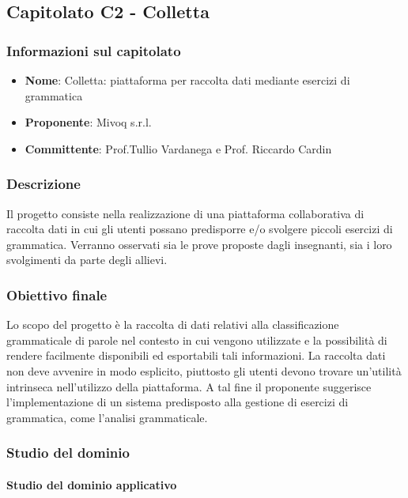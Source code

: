 \subsection{Capitolato C2 - Colletta}
\subsubsection{Informazioni sul capitolato}
\begin{itemize}
	\item \textbf{Nome}: Colletta: piattaforma per raccolta dati
	mediante esercizi di grammatica
	\item \textbf{Proponente}: Mivoq s.r.l.
	\item \textbf{Committente}: Prof.Tullio Vardanega e Prof. Riccardo Cardin
\end{itemize}
\subsubsection{Descrizione}

Il progetto consiste nella realizzazione di una piattaforma collaborativa di raccolta dati in cui gli utenti possano predisporre e/o svolgere piccoli esercizi di grammatica. Verranno osservati sia le prove proposte dagli insegnanti, sia i loro svolgimenti da parte degli allievi.
\subsubsection{Obiettivo finale}

Lo scopo del progetto è la raccolta di dati relativi alla classificazione grammaticale di parole nel contesto in cui vengono utilizzate e la possibilità di rendere facilmente disponibili ed esportabili tali informazioni. La raccolta dati non deve avvenire in modo esplicito, piuttosto gli utenti devono trovare un'utilità intrinseca nell'utilizzo della piattaforma. A tal fine il proponente suggerisce l'implementazione di un sistema predisposto alla gestione di esercizi di grammatica, come l'analisi grammaticale. 
\subsubsection{Studio del dominio}
\paragraph{Studio del dominio applicativo}

